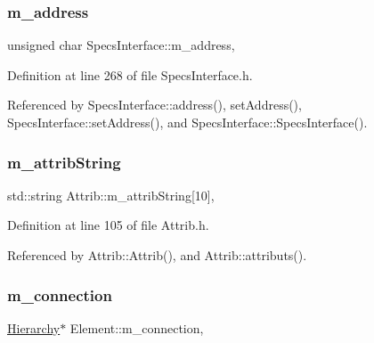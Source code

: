 \subsubsection{\texorpdfstring{m\+\_\+address}{m\_address}}
{\footnotesize\ttfamily unsigned char Specs\+Interface\+::m\+\_\+address\hspace{0.3cm}{\ttfamily [protected]}, {\ttfamily [inherited]}}



Definition at line 268 of file Specs\+Interface.\+h.



Referenced by Specs\+Interface\+::address(), set\+Address(), Specs\+Interface\+::set\+Address(), and Specs\+Interface\+::\+Specs\+Interface().

\mbox{\label{classAttrib_a3414521d7a82476e874b25a5407b5e63}} 
\subsubsection{\texorpdfstring{m\+\_\+attrib\+String}{m\_attribString}}
{\footnotesize\ttfamily std\+::string Attrib\+::m\+\_\+attrib\+String\mbox{[}10\mbox{]}\hspace{0.3cm}{\ttfamily [protected]}, {\ttfamily [inherited]}}



Definition at line 105 of file Attrib.\+h.



Referenced by Attrib\+::\+Attrib(), and Attrib\+::attributs().

\mbox{\label{classElement_abe3de7a5dbbc9a6dd2d7e012e5fdb266}} 
\subsubsection{\texorpdfstring{m\+\_\+connection}{m\_connection}}
{\footnotesize\ttfamily \hyperlink{classHierarchy}{Hierarchy}$\ast$ Element\+::m\+\_\+connection\hspace{0.3cm}{\ttfamily [protected]}, {\ttfamily [inherited]}}



